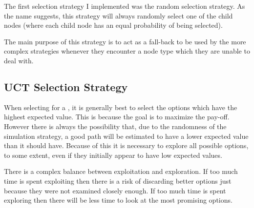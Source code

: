 The first selection strategy I implemented was the random selection strategy. As the name suggests, this strategy will always randomly select one of the child nodes (where each child node has an equal probability of being selected). 


The main purpose of this strategy is to act as a fall-back to be used by the more complex strategies whenever they encounter a node type which they are unable to deal with. 



\subsection{UCT Selection Strategy}					%


When selecting for a \choice, it is generally best to select the options which have the highest expected value. This is because the goal is to maximize the pay-off. However there is always the possibility that, due to the randomness of the simulation strategy, a good path will be estimated to have a lower expected value than it should have.
Because of this it is necessary to explore all possible options, to some extent, even if they initially appear to have low expected values. 


There is a complex balance between exploitation and exploration. If too much time is spent exploiting then there is a risk of discarding better options just because they were not examined closely enough. If too much time is spent exploring then there will be less time to look at the most promising options.


